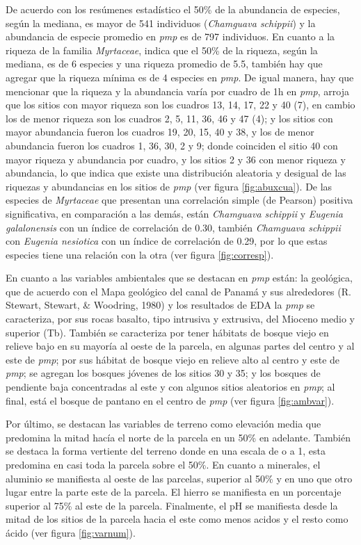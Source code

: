 \documentclass[11pt,]{article}
\begin{document}
De acuerdo con los resúmenes estadístico el 50\% de la abundancia de
especies, según la mediana, es mayor de 541 individuos (\emph{Chamguava
schippii}) y la abundancia de especie promedio en \emph{pmp} es de 797
individuos. En cuanto a la riqueza de la familia \emph{Myrtaceae},
indica que el 50\% de la riqueza, según la mediana, es de 6 especies y
una riqueza promedio de 5.5, también hay que agregar que la riqueza
mínima es de 4 especies en \emph{pmp}. De igual manera, hay que
mencionar que la riqueza y la abundancia varía por cuadro de 1h en
\emph{pmp}, arroja que los sitios con mayor riqueza son los cuadros 13,
14, 17, 22 y 40 (7), en cambio los de menor riqueza son los cuadros 2,
5, 11, 36, 46 y 47 (4); y los sitios con mayor abundancia fueron los
cuadros 19, 20, 15, 40 y 38, y los de menor abundancia fueron los
cuadros 1, 36, 30, 2 y 9; donde coinciden el sitio 40 con mayor riqueza
y abundancia por cuadro, y los sitios 2 y 36 con menor riqueza y
abundancia, lo que indica que existe una distribución aleatoria y
desigual de las riquezas y abundancias en los sitios de \emph{pmp} (ver
figura \ref{fig:abuxcua}). De las especies de \emph{Myrtaceae} que
presentan una correlación simple (de Pearson) positiva significativa, en
comparación a las demás, están \emph{Chamguava schippii} y \emph{Eugenia
galalonensis} con un índice de correlación de 0.30, también
\emph{Chamguava schippii} con \emph{Eugenia nesiotica} con un índice de
correlación de 0.29, por lo que estas especies tiene una relación con la
otra (ver figura \ref{fig:corresp}).

En cuanto a las variables ambientales que se destacan en \emph{pmp}
están: la geológica, que de acuerdo con el Mapa geológico del canal de
Panamá y sus alrededores (R. Stewart, Stewart, \& Woodring, 1980) y los
resultados de EDA la \emph{pmp} se caracteriza, por sus rocas basalto,
tipo intrusiva y extrusiva, del Mioceno medio y superior (Tb). También
se caracteriza por tener hábitats de bosque viejo en relieve bajo en su
mayoría al oeste de la parcela, en algunas partes del centro y al este
de \emph{pmp}; por sus hábitat de bosque viejo en relieve alto al centro
y este de \emph{pmp}; se agregan los bosques jóvenes de los sitios 30 y
35; y los bosques de pendiente baja concentradas al este y con algunos
sitios aleatorios en \emph{pmp}; al final, está el bosque de pantano en
el centro de \emph{pmp} (ver figura \ref{fig:ambvar}).

Por último, se destacan las variables de terreno como elevación media
que predomina la mitad hacía el norte de la parcela en un 50\% en
adelante. También se destaca la forma vertiente del terreno donde en una
escala de o a 1, esta predomina en casi toda la parcela sobre el 50\%.
En cuanto a minerales, el aluminio se manifiesta al oeste de las
parcelas, superior al 50\% y en uno que otro lugar entre la parte este
de la parcela. El hierro se manifiesta en un porcentaje superior al 75\%
al este de la parcela. Finalmente, el pH se manifiesta desde la mitad de
los sitios de la parcela hacia el este como menos acidos y el resto como
ácido (ver figura \ref{fig:varnum}).
\end{document}
